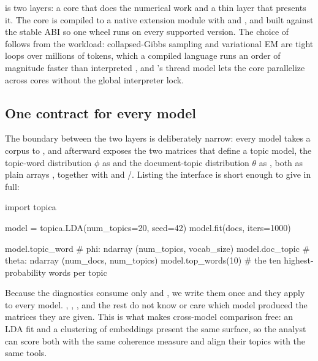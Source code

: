 \documentclass[article,nojss]{jss}
\begin{document}
 is two layers: a  core that does the numerical work
and a thin  layer that presents it. The core is compiled to a
native extension module with  \citep{pyo3} and 
\citep{maturin}, and built against the stable ABI so one wheel runs on every
supported  version. The choice of  follows from
the workload: collapsed-Gibbs sampling and variational EM are tight loops over
millions of tokens, which a compiled language runs an order of magnitude faster
than interpreted , and 's thread model lets the
core parallelize across cores without the global interpreter lock.

\subsection{One contract for every model}

The boundary between the two layers is deliberately narrow: every model takes a
corpus to , and afterward exposes the two matrices that define a topic
model, the topic-word distribution $\phi$ as  and the
document-topic distribution $\theta$ as , both as plain
 arrays \citep{harris2020numpy}, together with  and
/. Listing the interface is short enough to give in full:

\begin{CodeChunk}
\begin{CodeInput}
import topica

model = topica.LDA(num_topics=20, seed=42)
model.fit(docs, iters=1000)

model.topic_word        # phi: ndarray (num_topics, vocab_size)
model.doc_topic         # theta: ndarray (num_docs, num_topics)
model.top_words(10)     # the ten highest-probability words per topic
\end{CodeInput}
\end{CodeChunk}

Because the diagnostics consume only  and ,
we write them once and they apply to every model. ,
, , and the rest do not
know or care which model produced the matrices they are given. This is what makes
cross-model comparison free: an LDA fit and a clustering of embeddings present
the same surface, so the analyst can score both with the same coherence measure
and align their topics with the same tools.
\end{document}
